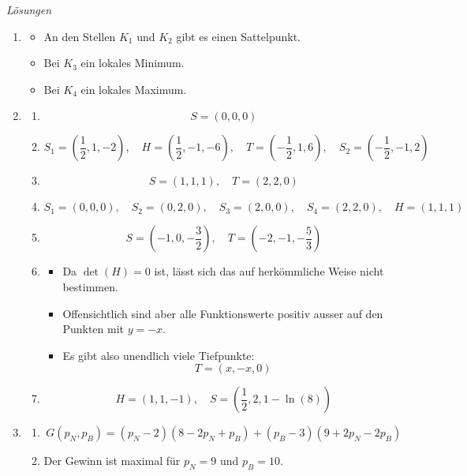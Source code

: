 \clearpage
\emph{Lösungen}
\begin{enumerate}
	\item

	      \begin{itemize}
		      \item An den Stellen \(K_1\) und \(K_2\) gibt es einen Sattelpunkt.
		      \item Bei \(K_3\) ein lokales Minimum.
		      \item Bei \(K_4\) ein lokales Maximum.
	      \end{itemize}

	\item
	      \begin{enumerate}
		      \item \[
			            S = (0,0,0)
		            \]

		      \item \[
			            S_1 = \left(\frac{1}{2}, 1, -2\right), \quad H = \left(\frac{1}{2}, -1, -6\right), \quad T = \left(-\frac{1}{2}, 1, 6\right), \quad S_2 = \left(-\frac{1}{2}, -1, 2\right)
		            \]
		      \item \[
			            S = (1, 1, 1), \quad T = (2, 2, 0)
		            \]

		      \item \[
			            S_1 = (0, 0, 0), \quad S_2 = (0, 2, 0), \quad S_3 = (2, 0, 0), \quad S_4 = (2, 2, 0), \quad H = (1, 1, 1)
		            \]

		      \item \[
			            S = \left(-1, 0, -\frac{3}{2}\right), \quad T = \left(-2, -1, -\frac{5}{3}\right)
		            \]
		      \item
		            \begin{itemize}
			            \item Da \(\det(H) = 0\) ist, lässt sich das auf herkömmliche Weise nicht bestimmen.
			            \item Offensichtlich sind aber alle Funktionswerte positiv ausser auf den Punkten mit \(y = -x\).
			            \item Es gibt also unendlich viele Tiefpunkte:
			                  \[
				                  T = (x, -x, 0)
			                  \]
		            \end{itemize}
		      \item \[
			            H = (1, 1, -1), \quad S = \left(\frac{1}{2}, 2, 1 - \ln(8)\right)
		            \]
	      \end{enumerate}

	\item
	      \begin{enumerate}
		      \item \[
			            G(p_N, p_B) = (p_N - 2)(8 - 2p_N + p_B) + (p_B - 3)(9 + 2p_N - 2p_B)
		            \]
		      \item Der Gewinn ist maximal für \(p_N = 9\) und \(p_B = 10\).
	      \end{enumerate}
\end{enumerate}
